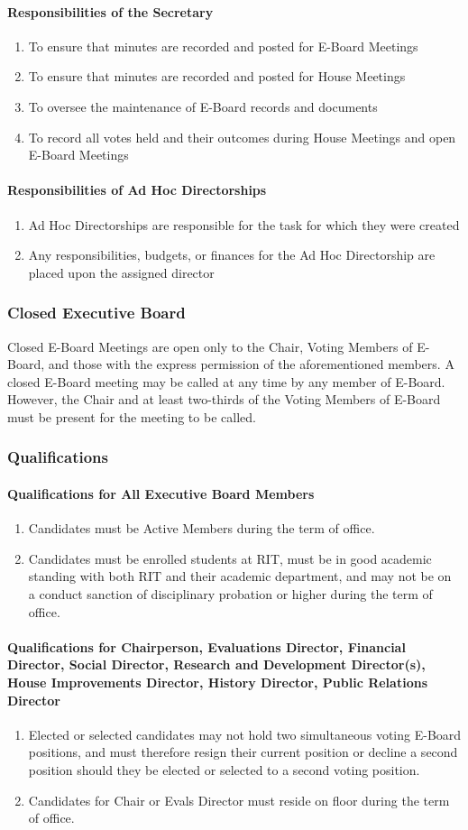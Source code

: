 \documentclass{article}
\newcommand{\asubsection}[1]{\subsubsection{#1} \label{#1}}
\newcommand{\asubsubsection}[1]{\paragraph{#1} \label{#1}}
\begin{document}
\asubsubsection{Responsibilities of the Secretary}
\begin{enumerate}
	\item To ensure that minutes are recorded and posted for E-Board Meetings
	\item To ensure that minutes are recorded and posted for House Meetings
	\item To oversee the maintenance of E-Board records and documents
	\item To record all votes held and their outcomes during House Meetings and open E-Board Meetings
\end{enumerate}

\asubsubsection{Responsibilities of Ad Hoc Directorships}
\begin{enumerate}
	\item Ad Hoc Directorships are responsible for the task for which they were created
	\item Any responsibilities, budgets, or finances for the Ad Hoc Directorship are placed upon the assigned director
\end{enumerate}

\asubsection{Closed Executive Board}
Closed E-Board Meetings are open only to the Chair, Voting Members of E-Board, and those with the express permission of the aforementioned members.
A closed E-Board meeting may be called at any time by any member of E-Board.
However, the Chair and at least two-thirds of the Voting Members of E-Board must be present for the meeting to be called.

\asubsection{Qualifications}

\asubsubsection{Qualifications for All Executive Board Members}
\begin{enumerate}
	\item Candidates must be Active Members during the term of office.
	\item Candidates must be enrolled students at RIT, must be in good academic standing with both RIT and their academic department, and may not be on a conduct sanction of disciplinary probation or higher during the term of office.
\end{enumerate}

\asubsubsection{Qualifications for Chairperson, Evaluations Director, Financial Director, Social Director, Research and Development Director(s), House Improvements Director, History Director, Public Relations Director}
\begin{enumerate}
	\item Elected or selected candidates may not hold two simultaneous voting E-Board positions, and must therefore resign their current position or decline a second position should they be elected or selected to a second voting position.
	\item Candidates for Chair or Evals Director must reside on floor during the term of office.
\end{enumerate}
\end{document}
